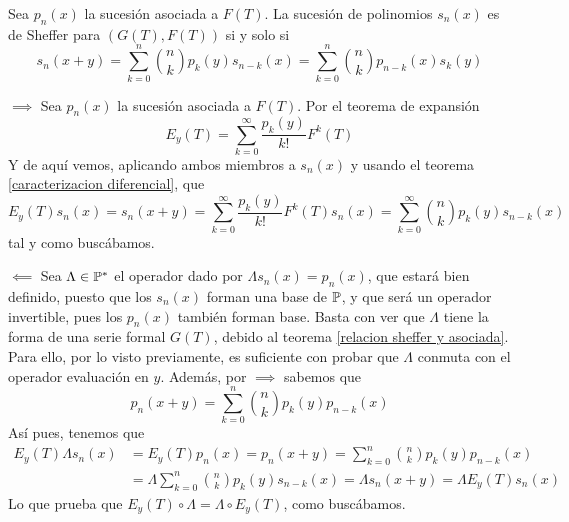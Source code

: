 \begin{teorema}\label{identidad de Sheffer}
    Sea $p_n(x)$ la sucesión asociada a $F(T)$. La sucesión de polinomios $s_n(x)$ es de Sheffer para $(G(T), F(T))$ si y solo si
    \begin{equation*}
        s_n (x+y) = \sum_{k=0}^n \binom{n}{k} p_k (y) s_{n-k}(x) = \sum_{k=0}^n \binom{n}{k} p_{n-k} (x) s_k (y) 
    \end{equation*}
\end{teorema}

\begin{demo}
    $\boxed{\implies}$ Sea $p_n(x)$ la sucesión asociada a $F(T)$. Por el teorema de expansión
    \begin{equation*}
        E_y(T) = \sum_{k=0}^\infty \frac{p_k(y)}{k!}F^k(T)
    \end{equation*}
    Y de aquí vemos, aplicando ambos miembros a $s_n(x)$ y usando el teorema \ref{caracterizacion diferencial}, que
    \begin{equation*}
        E_y(T) s_n(x) = s_n(x+y) = \sum_{k=0}^\infty \frac{p_k(y)}{k!}F^k(T)s_n(x) = \sum_{k=0}^\infty \binom{n}{k} p_k(y)s_{n-k}(x)
    \end{equation*}
    tal y como buscábamos.

    $\boxed{\impliedby}$ Sea $\Lambda \in \mathbb{P}^*$ el operador dado por $\Lambda s_n(x) = p_n(x)$, que estará bien definido, puesto que los $s_n(x)$ forman una base de $\mathbb{P}$, y que será un operador invertible, pues los $p_n(x)$ también forman base. Basta con ver que $\Lambda$ tiene la forma de una serie formal $G(T)$, debido al teorema \ref{relacion sheffer y asociada}. Para ello, por lo visto previamente, es suficiente con probar que $\Lambda$ conmuta con el operador evaluación en $y$. Además, por $\boxed{\implies}$ sabemos que
    \begin{equation*}
        p_n (x+y) = \sum_{k=0}^n \binom{n}{k} p_k (y) p_{n-k}(x) 
    \end{equation*}
    Así pues, tenemos que
    \begin{align*}
        E_{y}(T) \Lambda s_n(x) & = E_{y}(T) p_n(x) = p_n(x+y) = \sum_{k=0}^n \binom{n}{k} p_k (y) p_{n-k}(x)\\
        & = \Lambda \sum_{k=0}^n \binom{n}{k} p_k (y) s_{n-k}(x) = \Lambda s_n(x+y) = \Lambda E_{y}(T) s_n(x)
    \end{align*}
    Lo que prueba que $E_{y}(T) \circ \Lambda = \Lambda \circ E_{y}(T)$, como buscábamos.
\end{demo}

